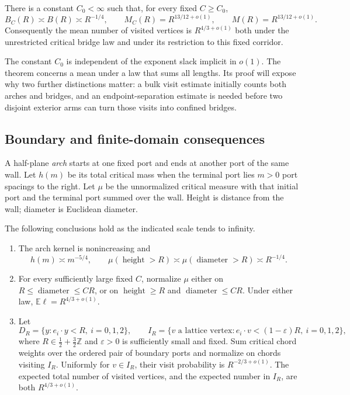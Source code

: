 \begin{theorem}
\label{thm:confined-bridge}
There is a constant $C_0<\infty$ such that, for every fixed $C\ge C_0$,
\[
 B_C(R)\asymp B(R)\asymp R^{-1/4},\qquad
 M_C(R)=R^{13/12+o(1)},\qquad M(R)=R^{13/12+o(1)}.
\]
Consequently the mean number of visited vertices is $R^{4/3+o(1)}$
both under the unrestricted critical bridge law and under its restriction
to this fixed corridor.
\end{theorem}

The constant $C_0$ is independent of the exponent slack implicit in $o(1)$.
The theorem concerns a mean under a law that sums all lengths.  Its proof
will expose why two further distinctions matter: a bulk visit estimate
initially counts both arches and bridges, and an endpoint-separation
estimate is needed before two disjoint exterior arms can turn those visits
into confined bridges.

\subsection{Boundary and finite-domain consequences}
A half-plane \emph{arch} starts at one fixed port and ends at another port
of the same wall.  Let $h(m)$ be its total critical mass when the terminal
port lies $m>0$ port spacings to the right.  Let $\mu$ be the unnormalized
critical measure with that initial port and the terminal port summed over
the wall.  Height is distance from the wall; diameter is Euclidean diameter.

\begin{theorem}
\label{thm:boundary}\label{c2:thm-annealed}
The following conclusions hold as the indicated scale tends to infinity.
\begin{enumerate}
\item The arch kernel is nonincreasing and
\[
 h(m)\asymp m^{-5/4},\qquad
 \mu(\operatorname{height}>R)\asymp
 \mu(\operatorname{diameter}>R)\asymp R^{-1/4}.
\]
\item For every sufficiently large fixed $C$, normalize $\mu$ either on
$R\le\operatorname{diameter}\le CR$, or on
$\operatorname{height}\ge R$ and $\operatorname{diameter}\le CR$.
Under either law, $\mathbb E\ell=R^{4/3+o(1)}$.
\item Let
\[
 D_R=\{y:e_i\cdot y<R,\ i=0,1,2\},\qquad
 I_R=\{v\text{ a lattice vertex}:e_i\cdot v<(1-\varepsilon)R,
 \ i=0,1,2\},
\]
where $R\in\frac12+\frac32\mathbb Z$ and $\varepsilon>0$ is sufficiently
small and fixed.  Sum critical chord weights over the ordered pair of
boundary ports and normalize on chords visiting $I_R$.
Uniformly for $v\in I_R$, their visit probability is $R^{-2/3+o(1)}$.
The expected total number of visited vertices, and the expected number in
$I_R$, are both $R^{4/3+o(1)}$.
\end{enumerate}
\end{theorem}

